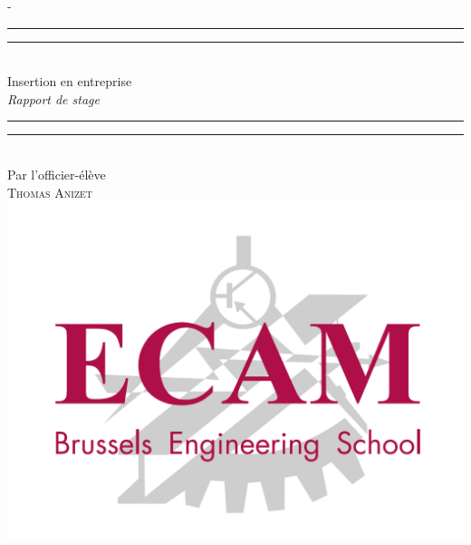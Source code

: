%
%
% 
%
%
\begin{titlingpage}
\begin{SingleSpace}
\calccentering{\unitlength} 
\begin{adjustwidth*}{\unitlength}{-\unitlength}
\vspace*{13mm}
\begin{center}
\rule[0.5ex]{\linewidth}{2pt}\vspace*{-\baselineskip}\vspace*{3.2pt}
\rule[0.5ex]{\linewidth}{1pt}\\[\baselineskip]
{\HUGE Insertion en entreprise }\\[4mm]
{\Large \textit{Rapport de stage}}\\
\rule[0.5ex]{\linewidth}{1pt}\vspace*{-\baselineskip}\vspace{3.2pt}
\rule[0.5ex]{\linewidth}{2pt}\\
\vspace{6.5mm}
{\large Par l'officier-élève}\\
\vspace{6.5mm}
{\large\textsc{Thomas Anizet}}\\
\vspace{11mm}
\includegraphics[scale=0.2]{logos/logo-ecam.png}\\

\end{center}
\end{adjustwidth*}
\end{SingleSpace}
\end{titlingpage}
